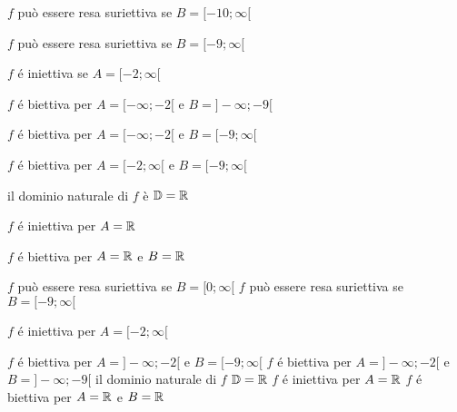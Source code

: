 \begin{questions}
    \question

    \begin{checkboxes}

        \choice $f$ può essere resa suriettiva se $B=[-10;\infty[$

        \CorrectChoice $f$ può essere resa suriettiva se $B=[-9;\infty[$

        \CorrectChoice $f$ é iniettiva se $A=[-2;\infty[$

        \choice $f$ é biettiva per $A=[-\infty;-2[$ e $B=]-\infty;-9[$

        \CorrectChoice $f$ é biettiva per $A=[-\infty;-2[$ e $B=[-9;\infty[$

        \CorrectChoice $f$ é biettiva per $A=[-2;\infty[$ e $B=[-9;\infty[$

        \CorrectChoice il dominio naturale di $f$ è $\mathbb{D}=\mathbb{R}$

        \choice $f$ é iniettiva per $A=\mathbb{R}$

        \choice $f$ é biettiva per $A=\mathbb{R}$ e $B=\mathbb{R}$

    \end{checkboxes}

    \question

    \begin{checkboxes}

        \CorrectChoice $f$  può essere resa suriettiva se  $B=[0;\infty[$
        \CorrectChoice $f$  può essere resa suriettiva se  $B=[-9;\infty[$

        \CorrectChoice $f$ é iniettiva per $A=[-2;\infty[$

                    \choice $f$ é biettiva per $A=]-\infty;-2[$ e $B=[-9;\infty[$
                    \CorrectChoice $f$ é biettiva per $A=]-\infty;-2[$ e $B=]-\infty;-9[$
        \CorrectChoice il dominio naturale di $f$ $\mathbb{D}=\mathbb{R}$
        \CorrectChoice $f$ é iniettiva per $A=\mathbb{R}$
        \CorrectChoice $f$ é biettiva per $A=\mathbb{R}$ e $B=\mathbb{R}$

    \end{checkboxes}
\end{questions}

